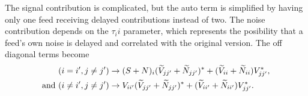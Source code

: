 The signal contribution is complicated, but the auto term is simplified by having only one feed receiving delayed contributions instead of two. The noise contribution depends on the $\tau_ii$ parameter, which represents the posibility that a feed's own noise is delayed and correlated with the original version. The off diagonal terms become
\begin{align}
(i=i', j\neq j') &\rightarrow (S + N)_{i} (\widetilde{V}_{jj'} + \widetilde{N}_{jj'})^* +  (\widetilde{V}_{ii} + \widetilde{N}_{ii})V^*_{jj'} ,
\\{\rm and~}(i\neq i', j\neq j') &\rightarrow V_{ii'}(\widetilde{V}_{jj'} + \widetilde{N}_{jj'})^* +  (\widetilde{V}_{ii'} + \widetilde{N}_{ii'})V^*_{jj'}.
\end{align}
